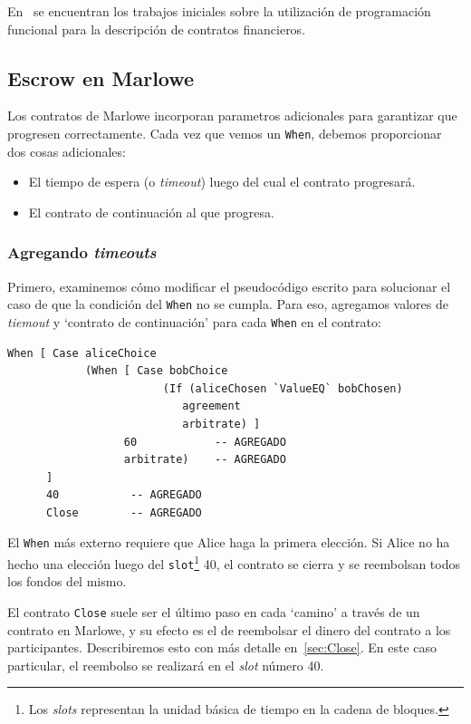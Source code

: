 \documentclass[12pt]{book}
\begin{document}
En~\cite{composing-contracts, multi-party-contracts} se encuentran los trabajos iniciales sobre la utilización de programación funcional para la descripción de contratos financieros.

\subsection{Escrow en Marlowe}

Los contratos de Marlowe incorporan parametros adicionales para garantizar que progresen correctamente. Cada vez que vemos un \texttt{When}, debemos proporcionar dos cosas adicionales:

\begin{itemize}
    \item El tiempo de espera (o \textit{timeout}) luego del cual el contrato progresará.
    \item El contrato de continuación al que progresa.
\end{itemize}

\subsubsection{Agregando \textit{timeouts}}

Primero, examinemos cómo modificar el pseudocódigo escrito para solucionar el caso de que la condición del \texttt{When} no se cumpla. Para eso, agregamos valores de \textit{tiemout} y `contrato de continuación' para cada \texttt{When} en el contrato:

\begin{lstlisting}[style=Haskell-cardano, language=Marlowe, caption=Pseudocódigo con timeouts.]
When [ Case aliceChoice
            (When [ Case bobChoice
                        (If (aliceChosen `ValueEQ` bobChosen)
                           agreement
                           arbitrate) ]
                  60            -- AGREGADO
                  arbitrate)    -- AGREGADO
      ]
      40           -- AGREGADO
      Close        -- AGREGADO
\end{lstlisting}

El \texttt{When} más externo requiere que Alice haga la primera elección. Si Alice no ha hecho una elección luego del \texttt{slot}\footnote{Los \textit{slots} representan la unidad básica de tiempo en la cadena de bloques.} 40, el contrato se cierra y se reembolsan todos los fondos del mismo.

El contrato \texttt{Close} suele ser el último paso en cada `camino' a través de un contrato en Marlowe, y su efecto es el de reembolsar el dinero del contrato a los participantes. Describiremos esto con más detalle en~\ref{sec:Close}. En este caso particular, el reembolso se realizará en el \textit{slot} número 40.
\end{document}
